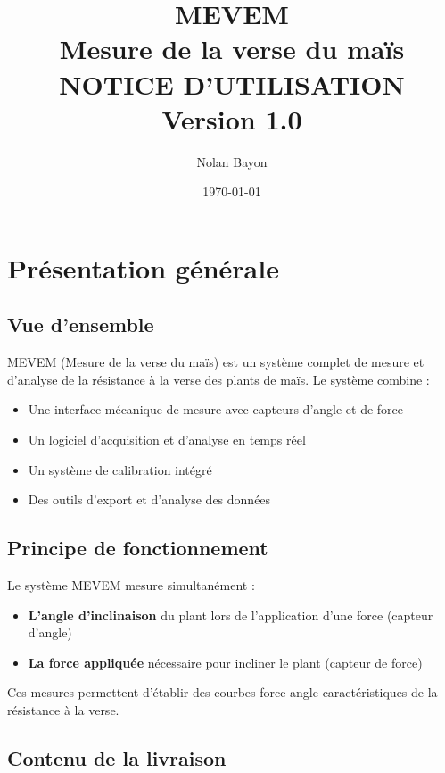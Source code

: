 \documentclass[12pt,a4paper]{article}
\title{%
    \vspace{-2cm}
    {\Huge \textbf{MEVEM}}\\[0.5cm]
    {\Large Mesure de la verse du maïs}\\[0.3cm]
    {\Large \textbf{NOTICE D'UTILISATION}}\\[0.5cm]
    {\normalsize Version 1.0}
}
\author{Nolan Bayon}
\date{\today}
\begin{document}
\maketitle
\thispagestyle{empty}

\newpage
\tableofcontents
\newpage

\section{Présentation générale}

\subsection{Vue d'ensemble}

MEVEM (Mesure de la verse du maïs) est un système complet de mesure et d'analyse de la résistance à la verse des plants de maïs. Le système combine :

\begin{itemize}
    \item Une interface mécanique de mesure avec capteurs d'angle et de force
    \item Un logiciel d'acquisition et d'analyse en temps réel
    \item Un système de calibration intégré
    \item Des outils d'export et d'analyse des données
\end{itemize}

\subsection{Principe de fonctionnement}

Le système MEVEM mesure simultanément :
\begin{itemize}
    \item \textbf{L'angle d'inclinaison} du plant lors de l'application d'une force (capteur d'angle)
    \item \textbf{La force appliquée} nécessaire pour incliner le plant (capteur de force)
\end{itemize}

Ces mesures permettent d'établir des courbes force-angle caractéristiques de la résistance à la verse.

\subsection{Contenu de la livraison}
\end{document}
